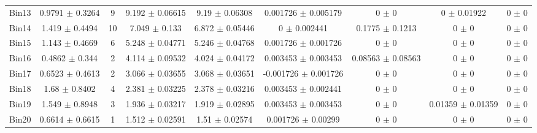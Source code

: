 \begin{tabular}{@{\extracolsep{4pt}}lcccccccc@{}}
     Bin13 & 0.9791 $\pm$ 0.3264 & 9 & 9.192 $\pm$ 0.06615 & 9.19 $\pm$ 0.06308 & 0.001726 $\pm$ 0.005179 & 0 $\pm$ 0 & 0 $\pm$ 0.01922 & 0 $\pm$ 0 \\ 
     Bin14 & 1.419 $\pm$ 0.4494 & 10 & 7.049 $\pm$ 0.133 & 6.872 $\pm$ 0.05446 & 0 $\pm$ 0.002441 & 0.1775 $\pm$ 0.1213 & 0 $\pm$ 0 & 0 $\pm$ 0 \\ 
     Bin15 & 1.143 $\pm$ 0.4669 & 6 & 5.248 $\pm$ 0.04771 & 5.246 $\pm$ 0.04768 & 0.001726 $\pm$ 0.001726 & 0 $\pm$ 0 & 0 $\pm$ 0 & 0 $\pm$ 0 \\ 
     Bin16 & 0.4862 $\pm$ 0.344 & 2 & 4.114 $\pm$ 0.09532 & 4.024 $\pm$ 0.04172 & 0.003453 $\pm$ 0.003453 & 0.08563 $\pm$ 0.08563 & 0 $\pm$ 0 & 0 $\pm$ 0 \\ 
     Bin17 & 0.6523 $\pm$ 0.4613 & 2 & 3.066 $\pm$ 0.03655 & 3.068 $\pm$ 0.03651 & -0.001726 $\pm$ 0.001726 & 0 $\pm$ 0 & 0 $\pm$ 0 & 0 $\pm$ 0 \\ 
     Bin18 & 1.68 $\pm$ 0.8402 & 4 & 2.381 $\pm$ 0.03225 & 2.378 $\pm$ 0.03216 & 0.003453 $\pm$ 0.002441 & 0 $\pm$ 0 & 0 $\pm$ 0 & 0 $\pm$ 0 \\ 
     Bin19 & 1.549 $\pm$ 0.8948 & 3 & 1.936 $\pm$ 0.03217 & 1.919 $\pm$ 0.02895 & 0.003453 $\pm$ 0.003453 & 0 $\pm$ 0 & 0.01359 $\pm$ 0.01359 & 0 $\pm$ 0 \\ 
     Bin20 & 0.6614 $\pm$ 0.6615 & 1 & 1.512 $\pm$ 0.02591 & 1.51 $\pm$ 0.02574 & 0.001726 $\pm$ 0.00299 & 0 $\pm$ 0 & 0 $\pm$ 0 & 0 $\pm$ 0 \\ 
\hline\hline
  \end{tabular}

